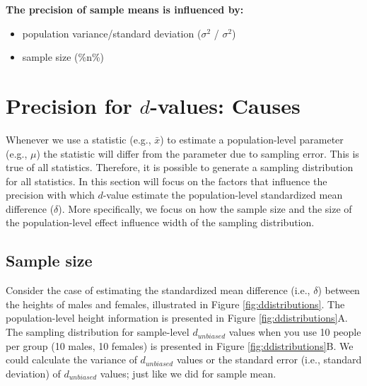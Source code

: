 \documentclass[
]{krantz}
\begin{document}
\textbf{The precision of sample means is influenced by:}

\begin{itemize}
\item
  population variance/standard deviation (\(\sigma^2\) / \(\sigma^2\))
\item
  sample size (\%n\%)
\end{itemize}

\newpage

\hypertarget{precision-for-d-values-causes}{%
\section{\texorpdfstring{Precision for \(d\)-values: Causes}{Precision for d-values: Causes}}\label{precision-for-d-values-causes}}

Whenever we use a statistic (e.g., \(\bar{x}\)) to estimate a population-level parameter (e.g., \(\mu\)) the statistic will differ from the parameter due to sampling error. This is true of all statistics. Therefore, it is possible to generate a sampling distribution for all statistics. In this section will focus on the factors that influence the precision with which \(d\)-value estimate the population-level standardized mean difference (\(\delta\)). More specifically, we focus on how the sample size and the size of the population-level effect influence width of the sampling distribution.

\hypertarget{sample-size}{%
\subsection{Sample size}\label{sample-size}}

Consider the case of estimating the standardized mean difference (i.e., \(\delta\)) between the heights of males and females, illustrated in Figure \ref{fig:ddistributions}. The population-level height information is presented in Figure \ref{fig:ddistributions}A. The sampling distribution for sample-level \(d_{unbiased}\) values when you use 10 people per group (10 males, 10 females) is presented in Figure \ref{fig:ddistributions}B. We could calculate the variance of \(d_{unbiased}\) values or the standard error (i.e., standard deviation) of \(d_{unbiased}\) values; just like we did for sample mean.
\end{document}
